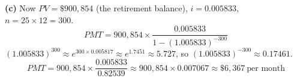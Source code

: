 \documentclass[addpoints]{exam}
\begin{document}
\begin{questions}
\begin{solution}
\textbf{(c)}
Now $PV = \$900{,}854$ (the retirement balance), $i = 0.005833$, $n = 25 \times 12 = 300$.
\[
PMT = 900{,}854 \times \frac{0.005833}{1-(1.005833)^{-300}}
\]
$(1.005833)^{300} \approx e^{300 \times 0.005817} \approx e^{1.7451} \approx 5.727$, so $(1.005833)^{-300} \approx 0.17461$.
\[
PMT = 900{,}854 \times \frac{0.005833}{0.82539}
    \approx 900{,}854 \times 0.007067
    \approx \$6{,}367\ \text{per month}
\]
\end{solution}

\end{questions}
\end{document}
